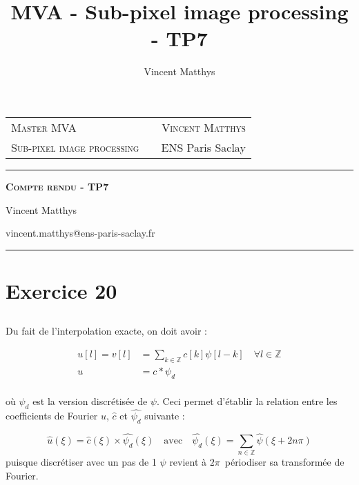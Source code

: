 \documentclass[12pt,a4paper,onecolumn]{article}
\title{MVA - Sub-pixel image processing - TP7}
\author{Vincent Matthys}
\begin{document}
\begin{tabularx}{0.9\textwidth}{@{} l X r @{} }
	{\textsc{Master MVA}}               &  & \textsc{Vincent Matthys} \\
	\textsc{Sub-pixel image processing} &  & {ENS Paris Saclay}       \\
\end{tabularx}
\vspace{1.5cm}
\begin{center}

	\rule[11pt]{5cm}{0.5pt}

	\textbf{\LARGE \textsc{Compte rendu - TP7}}
	\vspace{0.5cm}

	Vincent Matthys

	vincent.matthys@ens-paris-saclay.fr

	\rule{5cm}{0.5pt}

	\vspace{1.5cm}
\end{center}


\setcounter{section}{19}
\section{Exercice 20}

\subsection{}

Du fait de l'interpolation exacte, on doit avoir :

\begin{equation*}
	\begin{aligned}
		u[l] = v[l] & = \sum_{k\in\mathbb{Z}}c[k]\psi[l-k] \quad \forall l \in \mathbb{Z} \\
		u           & = c * \psi_d                                                        \\
	\end{aligned}
\end{equation*}

où \(\psi_d\) est la version discrétisée de \(\psi\). Ceci permet d'établir la relation entre les coefficients de Fourier \(\widehat{u}\), \(\widehat{c}\) et \(\widehat{\psi_d}\) suivante :

\begin{equation*}
	\widehat{u}(\xi) = \widehat{c}(\xi) \times \widehat{\psi_d}(\xi) \quad \text{avec} \quad \widehat{\psi_d}(\xi) = \sum_{n \in \mathbb{Z}}\widehat{\psi}(\xi + 2n\pi)
\end{equation*}
puisque discrétiser avec un pas de 1 \(\psi\) revient à \(2\pi\)~périodiser sa transformée de Fourier.
\end{document}
